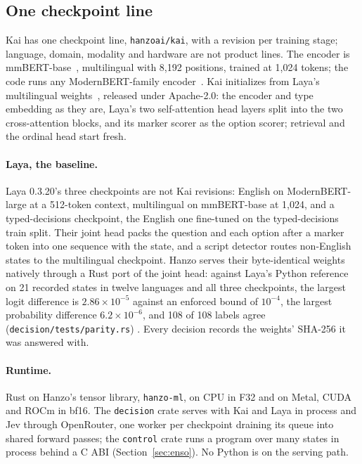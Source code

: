 \subsection{One checkpoint line}
\label{sec:checkpoints}

Kai has one checkpoint line, \texttt{hanzoai/kai}, with a revision per training
stage; language, domain, modality and hardware are not product lines. The
encoder is mmBERT-base~\cite{mmbert}, multilingual with 8{,}192 positions,
trained at 1{,}024 tokens; the code runs any ModernBERT-family
encoder~\cite{modernbert}. Kai initializes from Laya's multilingual
weights~\cite{laya}, released under Apache-2.0: the encoder and type embedding
as they are, Laya's two self-attention head layers split into the two
cross-attention blocks, and its marker scorer as the option scorer; retrieval
and the ordinal head start fresh.

\paragraph{Laya, the baseline.}
Laya 0.3.20's three checkpoints are not Kai revisions: English on
ModernBERT-large at a 512-token context, multilingual on mmBERT-base at 1,024,
and a typed-decisions checkpoint, the English one fine-tuned on the
typed-decisions~\cite{typeddecisions} train split. Their joint head packs the
question and each option after a marker token into one sequence with the state,
and a script detector routes non-English states to the multilingual checkpoint.
Hanzo serves their byte-identical weights natively through a Rust port of the
joint head: against Laya's Python reference on 21 recorded states in twelve
languages and all three checkpoints, the largest logit difference is
$2.86\times 10^{-5}$ against an enforced bound of $10^{-4}$, the largest
probability difference $6.2\times 10^{-6}$, and 108 of 108 labels agree
(\texttt{decision/tests/parity.rs}) \meas. Every decision records the weights'
SHA-256 it was answered with.

\paragraph{Runtime.}
Rust on Hanzo's tensor library, \texttt{hanzo-ml}, on CPU in F32 and on Metal,
CUDA and ROCm in bf16. The \texttt{decision} crate serves
 with Kai and Laya in process and Jev through
OpenRouter, one worker per checkpoint draining its queue into shared forward
passes; the \texttt{control} crate runs a program over many states in process
behind a C ABI (Section~\ref{sec:enso}). No Python is on the serving path.
